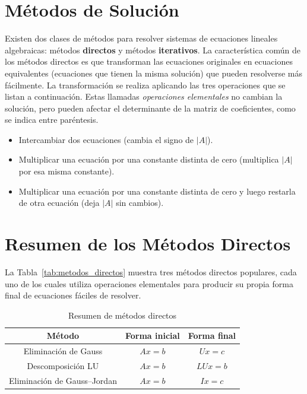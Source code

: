 \documentclass[12pt,letterpaper]{article}
\theoremstyle{definition}
\theoremstyle{plain}
\theoremstyle{remark}
\begin{document}
\section*{Métodos de Solución}

Existen dos clases de métodos para resolver sistemas de ecuaciones lineales algebraicas: métodos \textbf{directos} y métodos \textbf{iterativos}. La característica común de los métodos directos es que transforman las ecuaciones originales en ecuaciones equivalentes (ecuaciones que tienen la misma solución) que pueden resolverse más fácilmente. La transformación se realiza aplicando las tres operaciones que se listan a continuación. Estas llamadas \textit{operaciones elementales} no cambian la solución, pero pueden afectar el determinante de la matriz de coeficientes, como se indica entre paréntesis.

\begin{itemize}
    \item Intercambiar dos ecuaciones (cambia el signo de $|A|$).
    \item Multiplicar una ecuación por una constante distinta de cero (multiplica $|A|$ por esa misma constante).
    \item Multiplicar una ecuación por una constante distinta de cero y luego restarla de otra ecuación (deja $|A|$ sin cambios).
\end{itemize}

\section*{Resumen de los Métodos Directos}

La Tabla~\eqref{tab:metodos_directos} muestra tres métodos directos populares, cada uno de los cuales utiliza operaciones elementales para producir su propia forma final de ecuaciones fáciles de resolver.

\begin{table}[h!]
\centering
\begin{tabular}{|c|c|c|}
\hline
\textbf{Método} & \textbf{Forma inicial} & \textbf{Forma final} \\
\hline
Eliminación de Gauss & $Ax = b$ & $Ux = c$ \\
Descomposición LU & $Ax = b$ & $LUx = b$ \\
Eliminación de Gauss--Jordan & $Ax = b$ & $Ix = c$ \\
\hline
\end{tabular}
\caption{Resumen de métodos directos}
\label{tab:metodos_directos}
\end{table}
\end{document}

